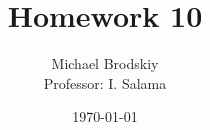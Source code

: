 


\title{Homework 10}
\date{\today}
\author{Michael Brodskiy\\ \small Professor: I. Salama}



\maketitle

